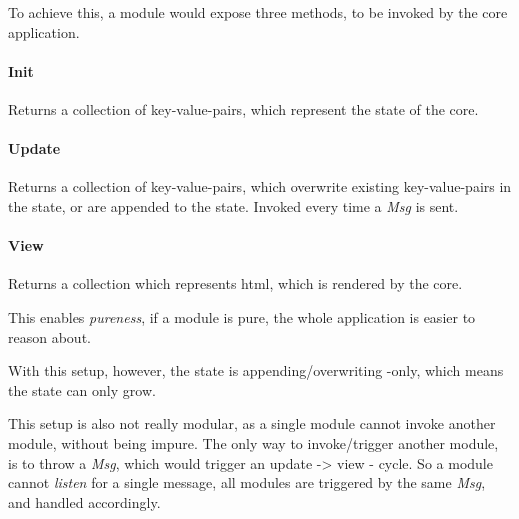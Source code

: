 To achieve this, a module would expose three methods, to be invoked by the core
application.

\paragraph{Init} Returns a collection of key-value-pairs, which represent
the state of the core.

\paragraph{Update} Returns a collection of key-value-pairs, which
overwrite existing key-value-pairs in the state, or are appended to the state.
Invoked every time a \textit{Msg} is sent.

\paragraph{View} Returns a collection which represents \gls{html},
which is rendered by the core.

This enables \textit{pureness}, if a module is pure, the whole application is
easier to reason about.

With this setup, however, the state is appending/overwriting -only, which means
the state can only grow.

This setup is also not really modular, as a single module cannot invoke another
module, without being impure. The only way to invoke/trigger another module, is
to throw a \textit{Msg}, which would trigger an update -> view - cycle. So
a module cannot \textit{listen} for a single message, all modules are triggered
by the same \textit{Msg}, and handled accordingly.

\begin{center}
  
\end{center}

\begin{center}
  \centering
  
\end{center}

\begin{center}
 
\end{center}

